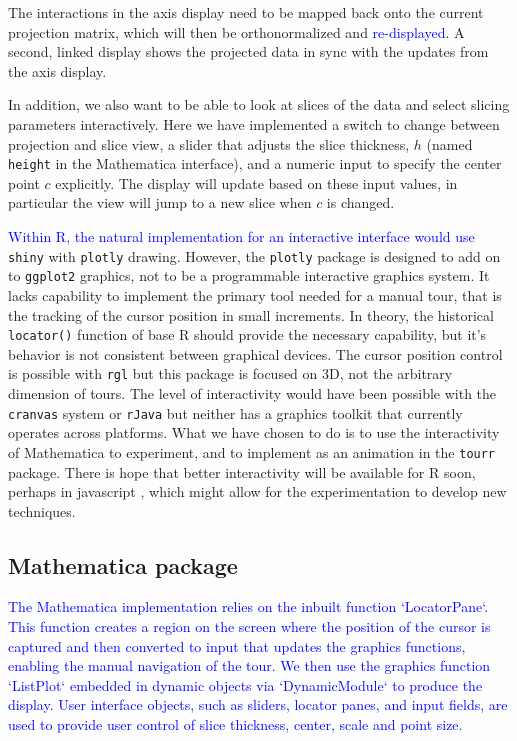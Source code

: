 \documentclass[]{interact}
\theoremstyle{plain}%
\theoremstyle{definition}
\theoremstyle{remark}
\begin{document}
The interactions in the axis display need to be mapped back onto the
current projection matrix, which will then be orthonormalized and
\textcolor{blue}{re-displayed}. A second, linked display shows the
projected data in sync with the updates from the axis display.

In addition, we also want to be able to look at slices of the data and
select slicing parameters interactively. Here we have implemented a
switch to change between projection and slice view, a slider that
adjusts the slice thickness, \(h\) (named \texttt{height} in the
Mathematica interface), and a numeric input to specify the center point
\(c\) explicitly. The display will update based on these input values,
in particular the view will jump to a new slice when \(c\) is changed.

\textcolor{blue}{Within R, the natural implementation for an interactive interface would use}
\texttt{shiny} \citep{shinym} with \texttt{plotly} \citep{plotly}
drawing. However, the \texttt{plotly} package is designed to add on to
\texttt{ggplot2} graphics, not to be a programmable interactive graphics
system. It lacks capability to implement the primary tool needed for a
manual tour, that is the tracking of the cursor position in small
increments. In theory, the historical \texttt{locator()} function of
base R should provide the necessary capability, but it's behavior is not
consistent between graphical devices. The cursor position control is
possible with \texttt{rgl} \citep{rgl} but this package is focused on
3D, not the arbitrary dimension of tours. The level of interactivity
would have been possible with the \texttt{cranvas} system
\citep{cranvas} or \texttt{rJava} \citep{rJava} but neither has a
graphics toolkit that currently operates across platforms. What we have
chosen to do is to use the interactivity of Mathematica to experiment,
and to implement as an animation in the \texttt{tourr} \citep{tourr}
package. There is hope that better interactivity will be available for R
soon, perhaps in javascript \citep[e.g.][\citet{detourr}]{langevitour},
which might allow for the experimentation to develop new techniques.

\hypertarget{mathematica-package}{%
\subsection{Mathematica package}\label{mathematica-package}}

\textcolor{blue}{The Mathematica implementation relies on the inbuilt function  `LocatorPane`. This function creates a region on the screen where the position of the cursor is captured and then converted to input that updates the graphics functions, enabling the manual navigation of the tour. We then use the graphics function `ListPlot` embedded in dynamic objects via  `DynamicModule` to produce the display. User interface objects, such as sliders, locator panes, and input fields, are used to provide user control of slice thickness, center, scale and point size.}
\end{document}
